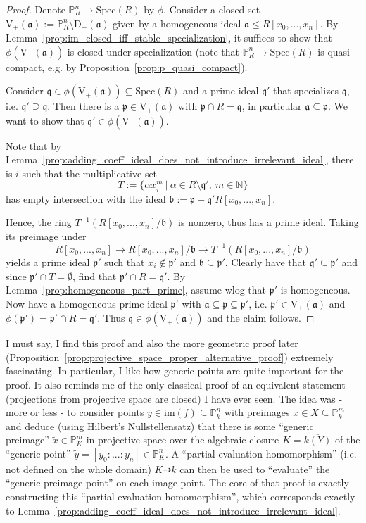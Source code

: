 \documentclass{scrartcl}
\newcommand{\N}{\mathbb{N}}
\newcommand{\V}[1]{\mathrm{V}_+(#1)}
\newcommand{\D}[1]{\mathrm{D}_+(#1)}
\renewcommand{\P}{\mathbb{P}}
\newcommand{\p}{\mathfrak{p}}
\newcommand{\q}{\mathfrak{q}}
\renewcommand{\a}{\mathfrak{a}}
\renewcommand{\b}{\mathfrak{b}}
\newcommand{\Spec}{\mathrm{Spec}}
\newcommand{\im}{\mathrm{im}}
\theoremstyle{definition}
\begin{document}
\begin{proof}
    Denote $\P_R^n \to \Spec(R)$ by $\phi$.
    Consider a closed set $\V{\a} := \P_R^n \setminus \D{\a}$ given by a homogeneous ideal $\a \leq R[x_0, ..., x_n]$.
    By Lemma~\ref{prop:im_closed_iff_stable_specialization}, it suffices to show that $\phi(\V{\a})$ is closed under specialization (note that $\P_R^n \to \Spec(R)$ is quasi-compact, e.g. by Proposition~\ref{prop:p_quasi_compact}).

    Consider $\q \in \phi(\V{\a}) \subseteq \Spec(R)$ and a prime ideal $\q'$ that specializes $\q$, i.e. $\q' \supseteq \q$.
    Then there is a $\p \in \V{\a}$ with $\p \cap R = \q$, in particular $\a \subseteq \p$.
    We want to show that $\q' \in \phi(\V{\a})$.

    Note that by Lemma~\ref{prop:adding_coeff_ideal_does_not_introduce_irrelevant_ideal}, there is $i$ such that the multiplicative set
    \begin{equation*}
        T := \{ \alpha x_i^m \ | \ \alpha \in R \setminus \q', \ m \in \N \}
    \end{equation*}
    has empty intersection with the ideal $\b := \p + \q' R[x_0, ..., x_n]$.
    
    Hence, the ring $T^{-1}(R[x_0, ..., x_n]/\b)$ is nonzero, thus has a prime ideal.
    Taking its preimage under
    \begin{equation*}
        R[x_0, ..., x_n] \to R[x_0, ..., x_n]/\b \to T^{-1}(R[x_0, ..., x_n]/\b)
    \end{equation*}
    yields a prime ideal $\p'$ such that $x_i \notin \p'$ and $\b \subseteq \p'$.
    Clearly have that $\q' \subseteq \p'$ and since $\p' \cap T = \emptyset$, find that $\p' \cap R = \q'$.
    By Lemma~\ref{prop:homogeneous_part_prime}, assume wlog that $\p'$ is homogeneous.
    Now have a homogeneous prime ideal $\p'$ with $\a \subseteq \p \subseteq \p'$, i.e. $\p' \in \V{\a}$ and $\phi(\p') = \p' \cap R = \q'$.
    Thus $\q \in \phi(\V{\a})$ and the claim follows.
\end{proof}
I must say, I find this proof and also the more geometric proof later (Proposition~\ref{prop:projective_space_proper_alternative_proof}) extremely fascinating.
In particular, I like how generic points are quite important for the proof.
It also reminds me of the only classical proof of an equivalent statement (projections from projective space are closed) I have ever seen.
The idea was - more or less - to consider points $y \in \im(f) \subseteq \P_k^n$ with preimages $x \in X \subseteq \P_k^m$ and deduce (using Hilbert's Nullstellensatz) that there is some ``generic preimage'' $\tilde{x} \in \P_K^m$ in projective space over the algebraic closure $K = \overline{k(Y)}$ of the ``generic point'' $\tilde{y} = [y_0 : ... : y_n] \in \P_K^n$.
A ``partial evaluation homomorphism'' (i.e. not defined on the whole domain) $K \dashrightarrow k$ can then be used to ``evaluate'' the ``generic preimage point'' on each image point.
The core of that proof is exactly constructing this ``partial evaluation homomorphism'', which corresponds exactly to Lemma~\ref{prop:adding_coeff_ideal_does_not_introduce_irrelevant_ideal}.
\end{document}
